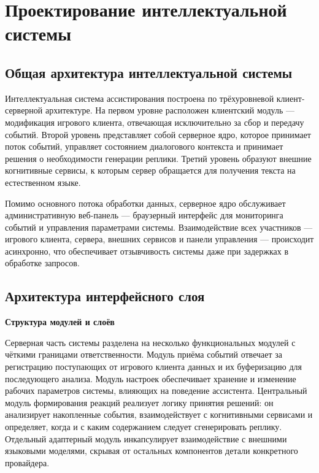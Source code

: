 
\section{Проектирование интеллектуальной системы}
\label{sec:designing}

\subsection{Общая архитектура интеллектуальной системы}

Интеллектуальная система ассистирования построена по трёхуровневой клиент-серверной архитектуре. На первом уровне расположен клиентский модуль — модификация игрового клиента, отвечающая исключительно за сбор и передачу событий. Второй уровень представляет собой серверное ядро, которое принимает поток событий, управляет состоянием диалогового контекста и принимает решения о необходимости генерации реплики. Третий уровень образуют внешние когнитивные сервисы, к которым сервер обращается для получения текста на естественном языке.

Помимо основного потока обработки данных, серверное ядро обслуживает административную веб-панель — браузерный интерфейс для мониторинга событий и управления параметрами системы. Взаимодействие всех участников — игрового клиента, сервера, внешних сервисов и панели управления — происходит асинхронно, что обеспечивает отзывчивость системы даже при задержках в обработке запросов.


\subsection{Архитектура интерфейсного слоя}

\textbf{Структура модулей и слоёв}

Серверная часть системы разделена на несколько функциональных модулей с чёткими границами ответственности. Модуль приёма событий отвечает за регистрацию поступающих от игрового клиента данных и их буферизацию для последующего анализа. Модуль настроек обеспечивает хранение и изменение рабочих параметров системы, влияющих на поведение ассистента. Центральный модуль формирования реакций реализует логику принятия решений: он анализирует накопленные события, взаимодействует с когнитивными сервисами и определяет, когда и с каким содержанием следует сгенерировать реплику. Отдельный адаптерный модуль инкапсулирует взаимодействие с внешними языковыми моделями, скрывая от остальных компонентов детали конкретного провайдера.

